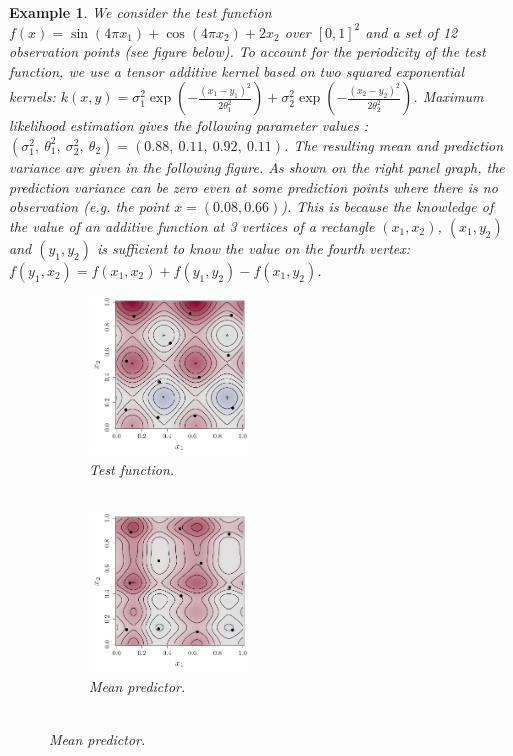 \documentclass[twoside,openright]{report}
\newtheorem{example}{Example}
\begin{document}
\begin{example}
	We consider the test function $f(x) = \sin(4 \pi x_1) + \cos(4 \pi x_2) + 2 x_2$ over $[0,1]^2$ and a set of 12 observation points (see figure below). To account for the periodicity of the test function, we use a tensor additive kernel based on two squared exponential kernels: $k(x,y) = \sigma^2_1 \exp \left(- \frac{(x_1-y_1)^2}{2 \theta_1^2} \right) + \sigma^2_2 \exp \left(- \frac{(x_2-y_2)^2}{2 \theta_2^2} \right)$. Maximum likelihood estimation gives the following parameter values : $(\sigma^2_1,\ \theta_1^2,\ \sigma^2_2 ,\ \theta_2) = (0.88,\ 0.11,\ 0.92,\ 0.11)$. The resulting mean and prediction variance are given in the following figure. As shown on the right panel graph, the prediction variance can be zero even at some prediction points where there is no observation (e.g. the point $x=(0.08,0.66)$). This is because the knowledge of the value of an additive function at 3 vertices of a rectangle $(x_1,x_2)$, $(x_1,y_2)$ and $(y_1,y_2)$ is sufficient to know the value on the fourth vertex: $f(y_1,x_2)=f(x_1,x_2)+f(y_1,y_2)-f(x_1,y_2)$.
	\begin{figure}[ht!]
        \centering
        \begin{subfigure}[t]{0.29\textwidth}
                \includegraphics[height=4.2cm]{figures/ch5_addfunc}
                \caption{Test function. \\ \ }
        \end{subfigure}%
        \hspace{0.2cm}       
        \begin{subfigure}[t]{0.29\textwidth}
                \includegraphics[height=4.2cm]{figures/ch5_addmean}
                \caption{Mean predictor. \\ \ }

\end{subfigure}
\end{figure}
\end{example}
\end{document}
